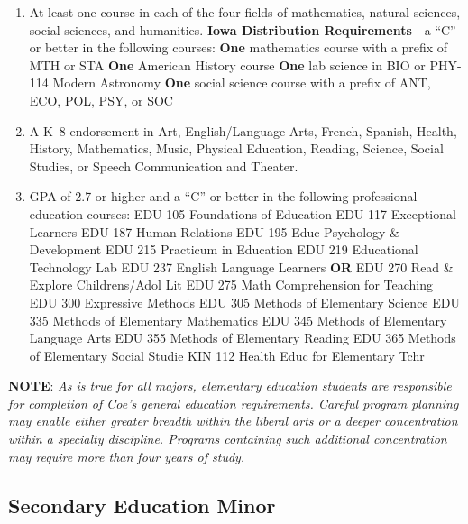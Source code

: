 \documentclass[
  letterpaper,
]{scrbook}
\begin{document}
\begin{enumerate}
\def\labelenumi{\arabic{enumi}.}
\item
  At least one course in each of the four fields of mathematics, natural
  sciences, social sciences, and humanities. \textbf{Iowa Distribution
  Requirements} - a ``C'' or better in the following courses:
  \textbf{One} mathematics course with a prefix of MTH or STA
  \textbf{One} American History course \textbf{One} lab science in BIO
  or PHY-114 Modern Astronomy \textbf{One} social science course with a
  prefix of ANT, ECO, POL, PSY, or SOC
\item
  A K--8 endorsement in Art, English/Language Arts, French, Spanish,
  Health, History, Mathematics, Music, Physical Education, Reading,
  Science, Social Studies, or Speech Communication and Theater.
\item
  GPA of 2.7 or higher and a ``C'' or better in the following
  professional education courses: EDU 105 Foundations of Education EDU
  117 Exceptional Learners EDU 187 Human Relations EDU 195 Educ
  Psychology \& Development EDU 215 Practicum in Education EDU 219
  Educational Technology Lab EDU 237 English Language Learners
  \textbf{OR} EDU 270 Read \& Explore Childrens/Adol Lit EDU 275 Math
  Comprehension for Teaching EDU 300 Expressive Methods EDU 305 Methods
  of Elementary Science EDU 335 Methods of Elementary Mathematics EDU
  345 Methods of Elementary Language Arts EDU 355 Methods of Elementary
  Reading EDU 365 Methods of Elementary Social Studie KIN 112 Health
  Educ for Elementary Tchr
\end{enumerate}

\textbf{NOTE}: \emph{As is true for all majors, elementary education
students are responsible for completion of Coe's general education
requirements. Careful program planning may enable either greater breadth
within the liberal arts or a deeper concentration within a specialty
discipline. Programs containing such additional concentration may
require more than four years of study.}

\hypertarget{secondary-education-minor}{%
\subsection{Secondary Education Minor}\label{secondary-education-minor}}
\end{document}
